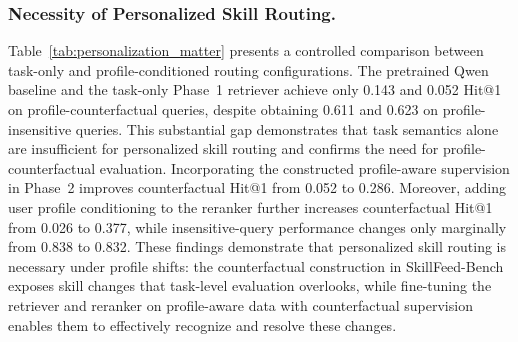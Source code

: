 \documentclass[letterpaper]{article} %
\begin{document}
\subsubsection{Necessity of Personalized Skill Routing.}
Table~\ref{tab:personalization_matter} presents a controlled comparison between task-only and profile-conditioned routing configurations. The pretrained Qwen baseline and the task-only Phase~1 retriever achieve only 0.143 and 0.052 Hit@1 on profile-counterfactual queries, despite obtaining 0.611 and 0.623 on profile-insensitive queries. This substantial gap demonstrates that task semantics alone are insufficient for personalized skill routing and confirms the need for profile-counterfactual evaluation. Incorporating the constructed profile-aware supervision in Phase~2 improves counterfactual Hit@1 from 0.052 to 0.286. Moreover, adding user profile conditioning to the reranker further increases counterfactual Hit@1 from 0.026 to 0.377, while insensitive-query performance changes only marginally from 0.838 to 0.832. These findings demonstrate that personalized skill routing is necessary under profile shifts: the counterfactual construction in SkillFeed-Bench exposes skill changes that task-level evaluation overlooks, while fine-tuning the retriever and reranker on profile-aware data with counterfactual supervision enables them to effectively recognize and resolve these changes.
\end{document}
